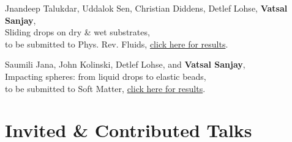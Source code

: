 \documentclass[10pt,a4paper,colorlinks,linkcolor=blue,urlcolor=blue,citecolor=blue]{moderncv}
\begin{document}
\begin{enumerate}[leftmargin=1.5em,label=\textbf{[\arabic*]}]
	\item Jnandeep Talukdar, Uddalok Sen, Christian Diddens, Detlef Lohse, \textbf{Vatsal Sanjay},\\
	Sliding drops on dry \& wet substrates,\\
	to be submitted to Phys. Rev. Fluids, \href{https://tinyurl.com/2xvlhlc6}{click here for results}.

	\item Saumili Jana, John Kolinski, Detlef Lohse, and \textbf{Vatsal Sanjay},\\
	Impacting spheres: from liquid drops to elastic beads,\\
	to be submitted to Soft Matter, \href{https://tinyurl.com/28s25jvf}{click here for results}.

\end{enumerate}

\section{Invited \& Contributed Talks}
\end{document}
